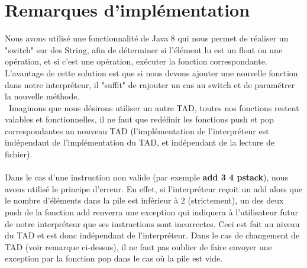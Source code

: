 \documentclass{article}
\begin{document}
\section*{Remarques d'implémentation}
Nous avons utilisé une fonctionnalité de Java 8 qui nous permet de réaliser un "switch" sur des String, afin de déterminer si l'élément lu est un float ou une opération, et si c'est une opération, exécuter la fonction correspondante. L'avantage de cette solution est que si nous devons ajouter une nouvelle fonction dans notre interpréteur, il "suffit" de rajouter un cas au switch et de paramétrer la nouvelle méthode. \\\
Imaginons que nous désirons utiliser un autre TAD, toutes nos fonctions restent valables et fonctionnelles, il ne faut que redéfinir les fonctions push et pop correspondantes au nouveau TAD (l'implémentation de l'interpréteur est indépendant de l'implémentation du TAD, et indépendant de la lecture de fichier).\\\\
Dans le cas d'une instruction non valide (par exemple \textbf{add 3 4 pstack}), nous avons utilisé le principe d'erreur. En effet, si l'interpréteur reçoit un add alors que le nombre d'éléments dans la pile est inférieur à 2 (strictement), un des deux push de la fonction add renverra une exception qui indiquera à l'utilisateur futur de notre interpréteur que ses instructions sont incorrectes. Ceci est fait au niveau du TAD et est donc indépendant de l'interpréteur. Dans le cas de changement de TAD (voir remarque ci-dessus), il ne faut pas oublier de faire envoyer une exception par la fonction pop dans le cas où la pile est vide.
 
\end{document}

